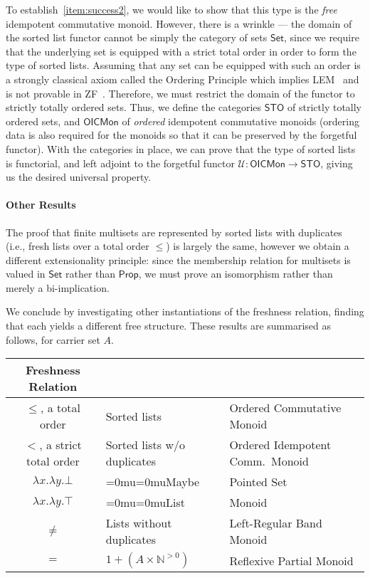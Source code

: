 \documentclass[a4paper]{easychair}
\newcommand{\AgdaFontStyle}[1]{\textsf{#1}}
\newcommand{\AgdaFormat}[2]{#2}
\newcommand{\AgdaNoSpaceMath}[1]
    {\begingroup\thickmuskip=0mu\medmuskip=0mu#1\endgroup}
\newcommand{\AgdaDatatype}[1]
    {\AgdaNoSpaceMath{\textcolor{AgdaDatatype}{\AgdaFontStyle{\AgdaFormat{#1}{{#1}}}}}}
\newcommand\setuniv{\mathsf{Set}} %
\newcommand\propuniv{\mathsf{Prop}} %
\newcommand\sto{\mathsf{STO}}
\newcommand\oicm{\mathsf{OICMon}}
\newcommand{\Forget}{\mathcal{U}}
\newcommand\forgetoicm{\Forget : \oicm{} \to{} \sto{}}
\begin{document}
To establish~\eqref{item:success2}, we would like to show that this type is the \emph{free} idempotent commutative monoid.
However, there is a wrinkle --- the domain of the sorted list functor cannot be simply the category of sets $\setuniv$, since we require that the underlying set is equipped with a strict total order in order to form the type of sorted lists.
Assuming that any set can be equipped with such an order is a strongly classical axiom called the Ordering Principle which implies LEM~\cite{swanOPLEM} and is not provable in ZF~\cite{jech1973choice}.
Therefore, we must restrict the domain of the functor to strictly totally ordered sets.
%
Thus, we define the categories $\sto$ of strictly totally ordered sets, and
$\oicm$ of \emph{ordered} idempotent commutative monoids (ordering data is also required for the monoids so that it can be preserved by the forgetful functor).
With the categories in place, we can prove that the type of sorted lists is functorial, and left adjoint to the forgetful functor $\forgetoicm$, giving us the desired universal property.

\paragraph{Other Results}

The proof that finite multisets are represented by sorted lists with duplicates (i.e., fresh lists over a total order $\leq$) is largely the same,
however we obtain a different extensionality principle:
since the membership relation for multisets is valued in $\setuniv$ rather than $\propuniv$, we must prove an isomorphism rather than merely a bi-implication.

We conclude %
by investigating other instantiations of the freshness relation,
finding that each yields a different free structure.
These results are summarised %
as follows, for carrier set $A$.

\begin{center}
\begin{tabular}{  |c|m{12em}|m{16em}| }
  \hline
  Freshness Relation & \centering{Data Structure} & \centering{Free Algebraic Structure} \tabularnewline
  \hline
  $\leq$, a total order & Sorted lists & Ordered Commutative Monoid \\
  $<$, a strict total order & Sorted lists w/o duplicates & Ordered Idempotent Comm.\ Monoid \\
  $\lambda x. \lambda y. \bot$ & \AgdaDatatype{Maybe} & Pointed Set \\
  $\lambda x. \lambda y. \top$ & \AgdaDatatype{List} & Monoid \\
  $\neq$ & Lists without duplicates & Left-Regular Band Monoid \\
  $=$ & $1 + (A \times \mathbb{N}^{>0})$ & Reflexive Partial Monoid \\
  \hline
\end{tabular}
\end{center}
\end{document}
